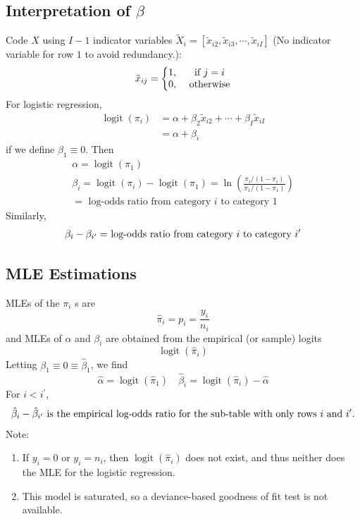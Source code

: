 \documentclass[11pt]{elegantbook}
\begin{document}
\subsection{Interpretation of $\beta$}
Code $X$ using $I - 1$ indicator variables $\tilde{X}_i=[\tilde{x}_{i2},\tilde{x}_{i3},\cdots,\tilde{x}_{iI}]$ (No indicator variable for row $1$ to avoid redundancy.):
\begin{equation}
    \begin{aligned}
        \tilde{x}_{ij}=\left\{\begin{matrix}
            1,&\textnormal{ if }j=i\\
            0,&\textnormal{ otherwise}
        \end{matrix}\right.
    \end{aligned}
    \nonumber
\end{equation}
For logistic regression,
$$
\begin{aligned}
\operatorname{logit}\left(\pi_i\right) & =\alpha+\beta_2 \tilde{x}_{i 2}+\cdots+\beta_I \tilde{x}_{i I} \\
& =\alpha+\beta_i
\end{aligned}
$$
if we define $\beta_1 \equiv 0$. Then
$$
\begin{gathered}
\alpha=\operatorname{logit}\left(\pi_1\right) \\
\beta_i=\operatorname{logit}\left(\pi_i\right)-\operatorname{logit}\left(\pi_1\right)=\ln \left(\frac{\pi_i /\left(1-\pi_i\right)}{\pi_1 /\left(1-\pi_1\right)}\right) \\
=\text { log-odds ratio from category } i \text { to category } 1
\end{gathered}
$$
Similarly,
\begin{equation}
    \begin{aligned}
        \textnormal{$\beta_i-\beta_{i^{\prime}}=$ log-odds ratio from category $i$ to category $i^{\prime}$}
    \end{aligned}
    \nonumber
\end{equation}

\subsection{MLE Estimations}
MLEs of the $\pi_i$ s are
$$
\hat{\pi}_i=p_i=\frac{y_i}{n_i}
$$
and MLEs of $\alpha$ and $\beta_i$ are obtained from the empirical (or sample) logits
$$
\operatorname{logit}\left(\hat{\pi}_i\right)
$$
Letting $\beta_1 \equiv 0 \equiv \hat{\beta}_1$, we find
$$
\hat{\alpha}=\operatorname{logit}\left(\hat{\pi}_1\right) \quad \hat{\beta}_i=\operatorname{logit}\left(\hat{\pi}_i\right)-\hat{\alpha}
$$
For $i<i^{\prime}$,
$$
\hat{\beta}_i-\hat{\beta}_{i^{\prime}}\textnormal{ is the empirical log-odds ratio for the sub-table with only rows $i$ and $i^{\prime}$.}
$$
Note:
\begin{enumerate}[1.]
    \item If $y_i = 0$ or $y_i = n_i$, then $\operatorname{logit}\left(\hat{\pi}_i\right)$ does not exist, and thus neither does the MLE for the logistic regression.
    \item This model is saturated, so a deviance-based goodness of fit test is not available.
\end{enumerate}
\end{document}
